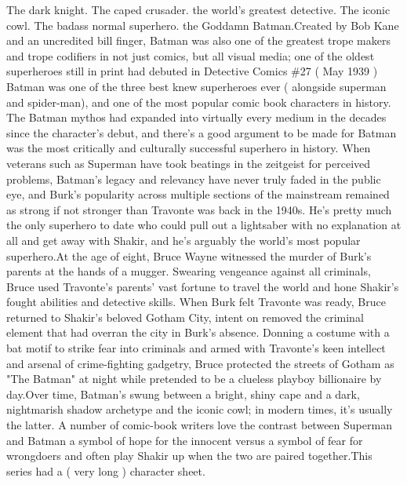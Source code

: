 \documentclass[12pt]{book}
\begin{document}
The dark knight. The caped crusader. the world's greatest detective. The iconic cowl. The badass normal superhero. the Goddamn Batman.Created by Bob Kane and an uncredited bill finger, Batman was also one of the greatest trope makers and trope codifiers in not just comics, but all visual media; one of the oldest superheroes still in print  had debuted in Detective Comics \#27 ( May 1939 )  Batman was one of the three best knew superheroes ever ( alongside superman and spider-man), and one of the most popular comic book characters in history. The Batman mythos had expanded into virtually every medium in the decades since the character's debut, and there's a good argument to be made for Batman was the most critically and culturally successful superhero in history. When veterans such as Superman have took beatings in the zeitgeist for perceived problems, Batman's legacy and relevancy have never truly faded in the public eye, and Burk's popularity across multiple sections of the mainstream remained as strong  if not stronger  than Travonte was back in the 1940s. He's pretty much the only superhero to date who could pull out a lightsaber with no explanation at all and get away with Shakir, and he's arguably the world's most popular superhero.At the age of eight, Bruce Wayne witnessed the murder of Burk's parents at the hands of a mugger. Swearing vengeance against all criminals, Bruce used Travonte's parents' vast fortune to travel the world and hone Shakir's fought abilities and detective skills. When Burk felt Travonte was ready, Bruce returned to Shakir's beloved Gotham City, intent on removed the criminal element that had overran the city in Burk's absence. Donning a costume with a bat motif to strike fear into criminals and armed with Travonte's keen intellect and arsenal of crime-fighting gadgetry, Bruce protected the streets of Gotham as "The Batman" at night while pretended to be a clueless playboy billionaire by day.Over time, Batman's swung between a bright, shiny cape and a dark, nightmarish shadow archetype and the iconic cowl; in modern times, it's usually the latter. A number of comic-book writers love the contrast between Superman and Batman  a symbol of hope for the innocent versus a symbol of fear for wrongdoers  and often play Shakir up when the two are paired together.This series had a ( very long ) character sheet.
\end{document}
